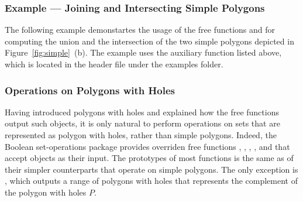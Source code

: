 \subsubsection{Example --- Joining and Intersecting Simple Polygons}
\label{bops_sssec:ex_simple_bops}

The following example demonstartes the usage of the free functions
 and  for computing the union and the
intersection of the two simple polygons depicted in
Figure~\ref{fig:simple}~(b). The example uses the auxiliary function
 listed above, which is located in
the header file  under the examples folder.


\subsubsection{Operations on Polygons with Holes}
\label{bops_sssec:pwh_bops}

Having introduced polygons with holes and explained how the free functions
output such objects, it is only natural to perform operations on sets that
are represented as polygon with holes, rather than simple polygons.
Indeed, the Boolean set-operations package provides overriden free functions
, , , ,
 and  that accept
 objects as their input. The prototypes of
most functions is the same as of their simpler counterparts that operate
on simple polygons. The only exception is , which
outputs a range of polygons with holes that represents the complement
of the polygon with holes $P$.

